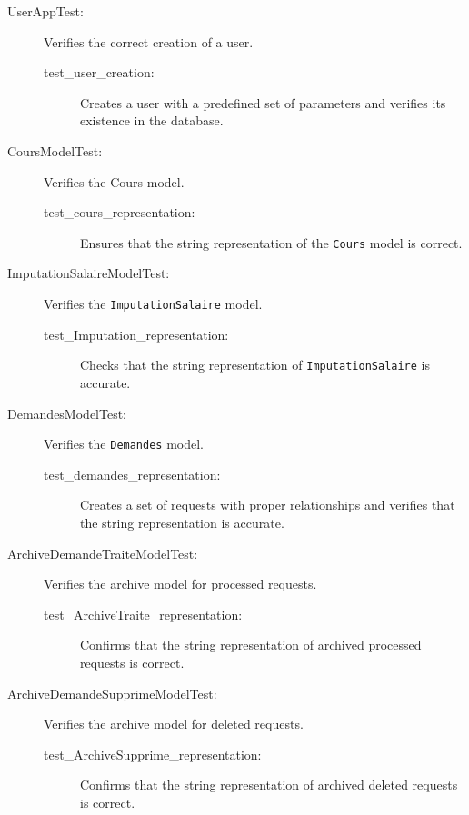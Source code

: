 \documentclass[12pt]{article}
\begin{document}
\begin{description}
  \item[UserAppTest:] Verifies the correct creation of a user.
  \begin{description}
    \item[test\_user\_creation:] Creates a user with a predefined set of parameters and verifies its existence in the database.
  \end{description}
  
  \item[CoursModelTest:] Verifies the Cours model.
  \begin{description}
    \item[test\_cours\_representation:] Ensures that the string representation of the \texttt{Cours} model is correct.
  \end{description}

  \item[ImputationSalaireModelTest:] Verifies the \texttt{ImputationSalaire} model.
  \begin{description}
    \item[test\_Imputation\_representation:] Checks that the string representation of \texttt{ImputationSalaire} is accurate.
  \end{description}

  \item[DemandesModelTest:] Verifies the \texttt{Demandes} model.
  \begin{description}
    \item[test\_demandes\_representation:] Creates a set of requests with proper relationships and verifies that the string representation is accurate.
  \end{description}

  \item[ArchiveDemandeTraiteModelTest:] Verifies the archive model for processed requests.
  \begin{description}
    \item[test\_ArchiveTraite\_representation:] Confirms that the string representation of archived processed requests is correct.
  \end{description}

  \item[ArchiveDemandeSupprimeModelTest:] Verifies the archive model for deleted requests.
  \begin{description}
    \item[test\_ArchiveSupprime\_representation:] Confirms that the string representation of archived deleted requests is correct.
  \end{description}
\end{description}
\end{document}
